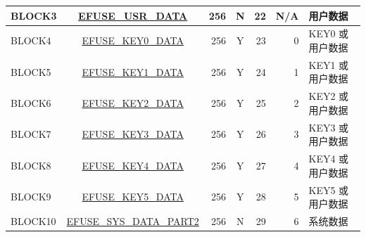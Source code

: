 \begin{longtable}[l]{ |l|c|r|c|r|r|l| }
    BLOCK3 & \hyperref[fielddesc:EFUSEUSRDATA0]{EFUSE\_USR\_DATA} & 256 & N & 22 & N/A & 用户数据 \\\hline
    BLOCK4 & \hyperref[fielddesc:EFUSEKEY0DATA0]{EFUSE\_KEY0\_DATA} & 256 & Y & 23 & 0 & KEY0 或用户数据 \\
    \hline
    BLOCK5 & \hyperref[fielddesc:EFUSEKEY1DATA0]{EFUSE\_KEY1\_DATA} & 256 & Y & 24 & 1 & KEY1 或用户数据 \\
    \hline
    BLOCK6 & \hyperref[fielddesc:EFUSEKEY2DATA0]{EFUSE\_KEY2\_DATA} & 256 & Y & 25 & 2 & KEY2 或用户数据 \\
    \hline
    BLOCK7 & \hyperref[fielddesc:EFUSEKEY3DATA0]{EFUSE\_KEY3\_DATA} & 256 & Y & 26 & 3 & KEY3 或用户数据 \\
    \hline
    BLOCK8 & \hyperref[fielddesc:EFUSEKEY4DATA0]{EFUSE\_KEY4\_DATA} & 256 & Y & 27 & 4 & KEY4 或用户数据 \\
    \hline
    BLOCK9 & \hyperref[fielddesc:EFUSEKEY5DATA0]{EFUSE\_KEY5\_DATA} & 256 & Y & 28 & 5 & KEY5 或用户数据 \\
    \hline
    BLOCK10 & \hyperref[fielddesc:EFUSESYSDATAPART20]{EFUSE\_SYS\_DATA\_PART2} & 256 & N & 29 & 6 & 系统数据 \\
    \hline
\end{longtable}
